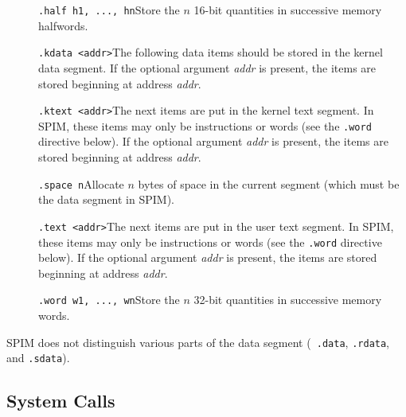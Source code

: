 \documentclass[11pt]{article}
\begin{document}
\begin{description}
  \item [] {\tt .half h1, ..., hn}\newline Store the $n$ 16-bit
quantities in successive memory halfwords.

  \item [] {\tt .kdata <addr>}\newline The following data items should
be stored in the kernel data segment. If the optional argument {\em
addr\/} is present, the items are stored beginning at address {\em
addr\/}.

  \item [] {\tt .ktext <addr>}\newline The next items are put in the
kernel text segment.  In SPIM, these items may only be instructions or
words (see the {\tt .word} directive below). If the optional argument
{\em addr\/} is present, the items are stored beginning at address
{\em addr\/}.

  \item [] {\tt .space n}\newline Allocate $n$ bytes of space in the
current segment (which must be the data segment in SPIM).

  \item [] {\tt .text <addr>}\newline The next items are put in the
user text segment.  In SPIM, these items may only be instructions or
words (see the {\tt .word} directive below).  If the optional argument
{\em addr\/} is present, the items are stored beginning at address
{\em addr\/}.

  \item [] {\tt .word w1, ..., wn}\newline Store the $n$ 32-bit
quantities in successive memory words.
\end{description}
SPIM does not distinguish various parts of the data segment ({\tt
.data}, {\tt .rdata}, and {\tt .sdata}).

\subsection{System Calls}
\label{sec:scall}
\end{document}
